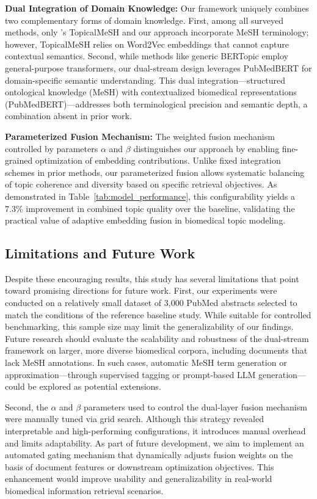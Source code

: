 \documentclass[utf8]{FrontiersinHarvard}
\begin{document}
\textbf{Dual Integration of Domain Knowledge:} Our framework uniquely combines two complementary forms of domain knowledge. First, among all surveyed methods, only \citet{yu_improving_2016}'s TopicalMeSH and our approach incorporate MeSH terminology; however, TopicalMeSH relies on Word2Vec embeddings that cannot capture contextual semantics. Second, while methods like generic BERTopic \citep{grootendorst_bertopic_2022} employ general-purpose transformers, our dual-stream design leverages PubMedBERT for domain-specific semantic understanding. This dual integration---structured ontological knowledge (MeSH) with contextualized biomedical representations (PubMedBERT)---addresses both terminological precision and semantic depth, a combination absent in prior work.

\textbf{Parameterized Fusion Mechanism:} The weighted fusion mechanism controlled by parameters $\alpha$ and $\beta$ distinguishes our approach by enabling fine-grained optimization of embedding contributions. Unlike fixed integration schemes in prior methods, our parameterized fusion allows systematic balancing of topic coherence and diversity based on specific retrieval objectives. As demonstrated in Table~\ref{tab:model_performance}, this configurability yields a $7.3\%$ improvement in combined topic quality over the baseline, validating the practical value of adaptive embedding fusion in biomedical topic modeling.

\subsection{Limitations and Future Work}

Despite these encouraging results, this study has several limitations that point toward promising directions for future work. First, our experiments were conducted on a relatively small dataset of 3,000 PubMed abstracts selected to match the conditions of the reference baseline study. While suitable for controlled benchmarking, this sample size may limit the generalizability of our findings. Future research should evaluate the scalability and robustness of the dual-stream framework on larger, more diverse biomedical corpora, including documents that lack MeSH annotations. In such cases, automatic MeSH term generation or approximation---through supervised tagging or prompt-based LLM generation---could be explored as potential extensions.

Second, the $\alpha$ and $\beta$ parameters used to control the dual-layer fusion mechanism were manually tuned via grid search. Although this strategy revealed interpretable and high-performing configurations, it introduces manual overhead and limits adaptability. As part of future development, we aim to implement an automated gating mechanism that dynamically adjusts fusion weights on the basis of document features or downstream optimization objectives. This enhancement would improve usability and generalizability in real-world biomedical information retrieval scenarios.
\end{document}
